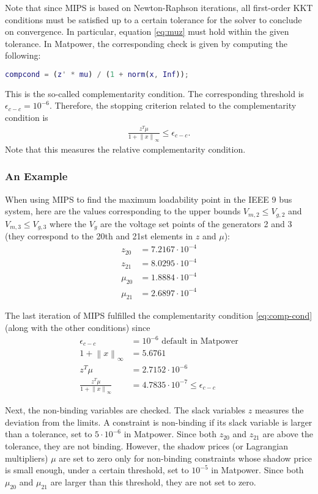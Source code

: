 \documentclass[11pt]{article}
\newcommand\norm[1]{\left\lVert#1\right\rVert}
\begin{document}
Note that since MIPS is based on Newton-Raphson iterations, all first-order KKT conditions must be satisfied up to a certain tolerance for the solver to conclude on convergence. 
In particular, equation \ref{eq:muz} must hold within the given tolerance.
In Matpower, the corresponding check is given by computing the following:
\begin{lstlisting}[language=Matlab]
compcond = (z' * mu) / (1 + norm(x, Inf));
\end{lstlisting}
This is the so-called complementarity condition.
The corresponding threshold is $\epsilon_{c-c} = 10^{-6}$.
Therefore, the stopping criterion related to the complementarity condition is
\begin{align}
  \label{eq:comp-cond}
  \frac{z^T \mu}{1+\norm{x}_\infty} \leq \epsilon_{c-c}.
\end{align}
Note that this measures the relative complementarity condition.

\subsubsection{An Example}
\label{sec:an-example}

When using MIPS to find the maximum loadability point in the IEEE 9 bus system, here are the values corresponding to the upper bounds $V_{m,2} \leq V_{g,2}$ and $V_{m,3} \leq V_{g,3}$ where the $V_g$ are the voltage set points of the generators 2 and 3 (they correspond to the 20th and 21st elements in $z$ and $\mu$):
\begin{align}
  \label{eq:2}
  z_{20} &= 7.2167 \cdot 10^{-4} \\
  z_{21} &= 8.0295 \cdot 10^{-4} \\
  \mu_{20} &= 1.8884 \cdot 10^{-4} \\
  \mu_{21} &= 2.6897 \cdot 10^{-4}
\end{align}

The last iteration of MIPS fulfilled the complementarity condition \eqref{eq:comp-cond} (along with the other conditions) since 
\begin{align}
  \label{eq:3}
  \epsilon_{c-c} &= 10^{-6} \text{ default in Matpower} \\
  1+\norm{x}_\infty &= 5.6761 \\
  z^T \mu &= 2.7152 \cdot 10^{-6} \\
  \frac{z^T \mu}{1+\norm{x}_\infty} &= 4.7835 \cdot 10^{-7} \leq \epsilon_{c-c}
\end{align}

Next, the non-binding variables are checked. 
The slack variables $z$ measures the deviation from the limits. 
A constraint is non-binding if its slack variable is larger than a tolerance, set to $5 \cdot 10^{-6}$ in Matpower.
Since both $z_{20}$ and $z_{21}$ are above the tolerance, they are not binding. 
However, the shadow prices (or Lagrangian multipliers) $\mu$ are set to zero only for non-binding constraints whose shadow price is small enough, under a certain threshold, set to $10^{-5}$ in Matpower. 
Since both $\mu_{20}$ and $\mu_{21}$ are larger than this threshold, they are not set to zero.
\end{document}
